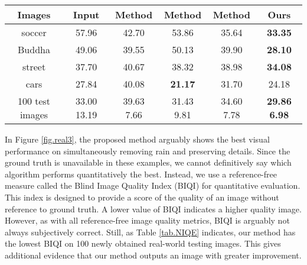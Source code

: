 \documentclass[journal]{IEEEtran}
\begin{document}
\begin{table*}[ht]
\caption{Quantitative measurement results of BIQI on real-world test images.}
\label{tab.NIQE}
\centering
\begin{tabular}{|c|c|c|c|c|c|}
\hline
Images &Input & Method \cite{13} & Method \cite{16} & Method \cite{34} &Ours\\
\hline
soccer&57.96& 42.70 &   53.86 &35.64 &\textbf{33.35}\\
\hline
Buddha&49.06& 39.55 &  50.13  & 39.90 &\textbf{28.10}\\
\hline
street&37.70& 40.67  &  38.32 & 38.98 &\textbf{34.08}\\
\hline
cars & 27.84 & 40.08 & \textbf{21.17} &31.70 &24.18\\
\hline
100 test images&33.00  13.19& 39.63  7.66  & 31.43  9.81 &  34.60  7.78 &\textbf{29.86  6.98}\\
\hline
\end{tabular}
\end{table*}
In Figure \ref{fig.real3}, the proposed method arguably shows the best visual performance on simultaneously removing rain and preserving details. Since the ground truth is unavailable in these examples, we cannot definitively say which algorithm performs quantitatively the best. Instead, we use a reference-free measure called the Blind Image Quality Index (BIQI) \cite{moorthy2010two} for quantitative evaluation. This index is designed to provide a score of the quality of an image without reference to ground truth. A lower value of BIQI indicates a higher quality image. However, as with all reference-free image quality metrics, BIQI is arguably not always subjectively correct. Still, as Table \ref{tab.NIQE} indicates, our method has the lowest BIQI on 100 newly obtained real-world testing images. This gives additional evidence that our method outputs an image with greater improvement.
\end{document}
